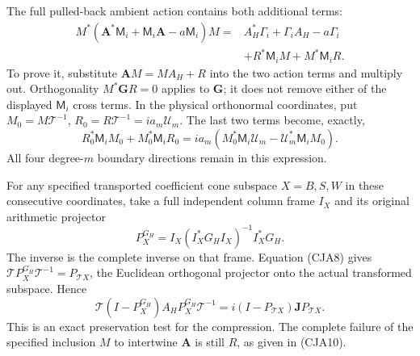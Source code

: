 The full pulled-back ambient action contains both additional terms:
\begin{equation}
 \begin{split}
 M^*(\mathbf A^*\mathsf M_i+\mathsf M_i\mathbf A-a\mathsf M_i)M
 ={}&A_H^*\Gamma_i+\Gamma_iA_H-a\Gamma_i\\
   &+R^*\mathsf M_iM+M^*\mathsf M_iR .
 \end{split}
 \tag{CJA14}
\end{equation}
To prove it, substitute \(\mathbf AM=MA_H+R\) into the two
action terms and multiply out.  Orthogonality
\(M^*\mathbf GR=0\) applies to \(\mathbf G\);
it does not remove either of the displayed \(\mathsf M_i\) cross terms.
In the physical orthonormal coordinates, put
\(M_0=M\mathcal T^{-1}\), \(R_0=R\mathcal T^{-1}=ia_m\mathcal U_m\).
The last two terms become, exactly,
\begin{equation}
 R_0^*\mathsf M_iM_0+M_0^*\mathsf M_iR_0
 =ia_m(M_0^*\mathsf M_i\mathcal U_m
              -\mathcal U_m^*\mathsf M_iM_0).
 \tag{CJA15}
\end{equation}
All four degree-\(m\) boundary directions remain in this expression.

For any specified transported coefficient cone subspace \(X=B,S,W\)
in these consecutive coordinates,
take a full independent column frame \(I_X\) and its original
arithmetic projector
\[
 P_X^{G_H}=I_X(I_X^*G_HI_X)^{-1}I_X^*G_H .
\]
The inverse is the complete inverse on that frame.
Equation (CJA8) gives
\(\mathcal TP_X^{G_H}\mathcal T^{-1}=P_{\mathcal TX}\),
the Euclidean orthogonal projector onto the actual transformed
subspace.  Hence
\begin{equation}
 \mathcal T(I-P_X^{G_H})A_HP_X^{G_H}\mathcal T^{-1}
     =i(I-P_{\mathcal TX})\mathbf JP_{\mathcal TX}.
 \tag{CJA16}
\end{equation}
This is an exact preservation test for the compression.
The complete failure of the specified inclusion \(M\) to intertwine
\(\mathbf A\) is still \(R\), as given in (CJA10).

